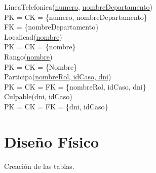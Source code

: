 \documentclass[10pt,a4paper]{article}
\begin{document}
\newline
LineaTelefonica(\underline{numero}, \underline{\underline{nombreDepartamento}})\\ 
	PK = CK = \{numero, nombreDepartamento\}\\ 
	FK = \{nombreDepartamento\}\\
\newline
Localicad(\underline{nombre})\\ 
	PK = CK = \{nombre\}\\ 
\newline
Rango(\underline{nombre})\\ 
	PK = CK = \{Nombre\}\\ 
\newline
Participa(\underline{\underline{nombreRol, idCaso, dni}})\\ 
	PK = CK = FK = \{nombreRol, idCaso, dni\}\\ 
\newline
Culpable(\underline{\underline{dni, idCaso}})\\ 
	PK = CK = FK = \{dni, idCaso\}\\ 

\section{Diseño Físico}
Creación de las tablas.
\end{document}
